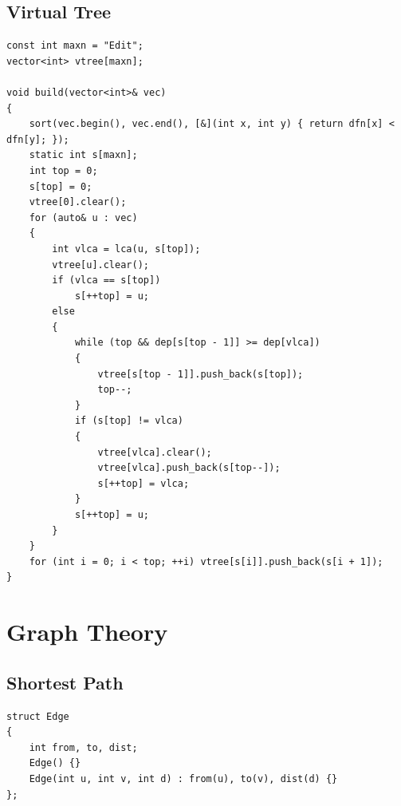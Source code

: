 \documentclass[twoside]{article}
\begin{document}
\subsection{Virtual Tree}
\begin{lstlisting}
const int maxn = "Edit";
vector<int> vtree[maxn];

void build(vector<int>& vec)
{
    sort(vec.begin(), vec.end(), [&](int x, int y) { return dfn[x] < dfn[y]; });
    static int s[maxn];
    int top = 0;
    s[top] = 0;
    vtree[0].clear();
    for (auto& u : vec)
    {
        int vlca = lca(u, s[top]);
        vtree[u].clear();
        if (vlca == s[top])
            s[++top] = u;
        else
        {
            while (top && dep[s[top - 1]] >= dep[vlca])
            {
                vtree[s[top - 1]].push_back(s[top]);
                top--;
            }
            if (s[top] != vlca)
            {
                vtree[vlca].clear();
                vtree[vlca].push_back(s[top--]);
                s[++top] = vlca;
            }
            s[++top] = u;
        }
    }
    for (int i = 0; i < top; ++i) vtree[s[i]].push_back(s[i + 1]);
}
\end{lstlisting}
\clearpage\section{Graph Theory}
\subsection{Shortest Path}
\begin{lstlisting}
struct Edge
{
    int from, to, dist;
    Edge() {}
    Edge(int u, int v, int d) : from(u), to(v), dist(d) {}
};\end{lstlisting}
\end{document}
